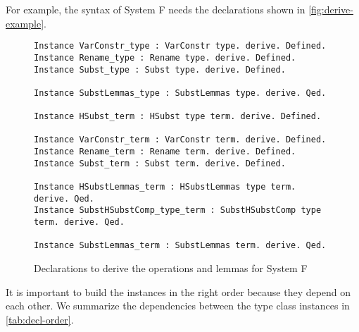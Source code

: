 \documentclass{scrartcl}
\begin{document}
For example, the syntax of System F needs the declarations shown in \autoref{fig:derive-example}.
\begin{figure}
  \centering
\begin{lstlisting}
Instance VarConstr_type : VarConstr type. derive. Defined.
Instance Rename_type : Rename type. derive. Defined.
Instance Subst_type : Subst type. derive. Defined.

Instance SubstLemmas_type : SubstLemmas type. derive. Qed.

Instance HSubst_term : HSubst type term. derive. Defined.

Instance VarConstr_term : VarConstr term. derive. Defined.
Instance Rename_term : Rename term. derive. Defined.
Instance Subst_term : Subst term. derive. Defined.

Instance HSubstLemmas_term : HSubstLemmas type term. derive. Qed.
Instance SubstHSubstComp_type_term : SubstHSubstComp type term. derive. Qed.

Instance SubstLemmas_term : SubstLemmas term. derive. Qed.
\end{lstlisting}
  \caption{Declarations to derive the operations and lemmas for System F}
  \label{fig:derive-example}
\end{figure}
It is important to build the instances in the right order because they depend on each other.
We summarize the dependencies between the type class instances in \autoref{tab:decl-order}.
\end{document}
